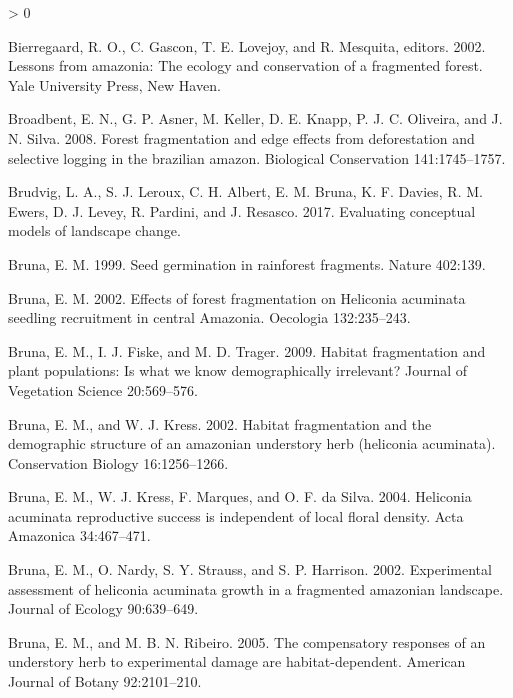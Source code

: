 \documentclass[
  english,
  man]{apa6}
\newlength{\cslhangindent}
\newenvironment{CSLReferences}[2] %
 {%
  \setlength{\parindent}{0pt}
  \ifodd #1 \everypar{\setlength{\hangindent}{\cslhangindent}}\ignorespaces\fi
  \ifnum #2 > 0
  \setlength{\parskip}{#2\baselineskip}
  \fi
 }%
 {}
\begin{document}
\hypertarget{refs}{}
\begin{CSLReferences}{1}{0}
\leavevmode\hypertarget{ref-lessons2002}{}%
Bierregaard, R. O., C. Gascon, T. E. Lovejoy, and R. Mesquita, editors. 2002. Lessons from amazonia: The ecology and conservation of a fragmented forest. Yale University Press, New Haven.

\leavevmode\hypertarget{ref-broadbent2008}{}%
Broadbent, E. N., G. P. Asner, M. Keller, D. E. Knapp, P. J. C. Oliveira, and J. N. Silva. 2008. Forest fragmentation and edge effects from deforestation and selective logging in the brazilian amazon. Biological Conservation 141:1745--1757.

\leavevmode\hypertarget{ref-brudvig2017}{}%
Brudvig, L. A., S. J. Leroux, C. H. Albert, E. M. Bruna, K. F. Davies, R. M. Ewers, D. J. Levey, R. Pardini, and J. Resasco. 2017. Evaluating conceptual models of landscape change.

\leavevmode\hypertarget{ref-bruna1999}{}%
Bruna, E. M. 1999. Seed germination in rainforest fragments. Nature 402:139.

\leavevmode\hypertarget{ref-bruna2002b}{}%
Bruna, E. M. 2002. Effects of forest fragmentation on Heliconia acuminata seedling recruitment in central Amazonia. Oecologia 132:235--243.

\leavevmode\hypertarget{ref-bruna2009}{}%
Bruna, E. M., I. J. Fiske, and M. D. Trager. 2009. Habitat fragmentation and plant populations: Is what we know demographically irrelevant? Journal of Vegetation Science 20:569--576.

\leavevmode\hypertarget{ref-bruna2002}{}%
Bruna, E. M., and W. J. Kress. 2002. Habitat fragmentation and the demographic structure of an amazonian understory herb (heliconia acuminata). Conservation Biology 16:1256--1266.

\leavevmode\hypertarget{ref-bruna2004}{}%
Bruna, E. M., W. J. Kress, F. Marques, and O. F. da Silva. 2004. Heliconia acuminata reproductive success is independent of local floral density. Acta Amazonica 34:467--471.

\leavevmode\hypertarget{ref-bruna2002a}{}%
Bruna, E. M., O. Nardy, S. Y. Strauss, and S. P. Harrison. 2002. Experimental assessment of heliconia acuminata growth in a fragmented amazonian landscape. Journal of Ecology 90:639--649.

\leavevmode\hypertarget{ref-bruna2005}{}%
Bruna, E. M., and M. B. N. Ribeiro. 2005. The compensatory responses of an understory herb to experimental damage are habitat-dependent. American Journal of Botany 92:2101--210.


\end{CSLReferences}
\end{document}

